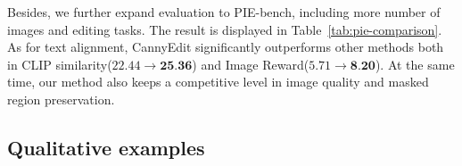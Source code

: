 \documentclass{article}
\begin{document}


Besides, we further expand evaluation to PIE-bench, including more number of images and editing tasks. The result is displayed in Table~\ref{tab:pie-comparison}. As for text alignment, CannyEdit significantly outperforms other methods both in CLIP similarity($22.44\rightarrow \textbf{25.36}$) and Image Reward($5.71\rightarrow \textbf{8.20}$). At the same time, our method also keeps a competitive level in image quality and masked region preservation. 

\subsection{Qualitative examples}
\end{document}
